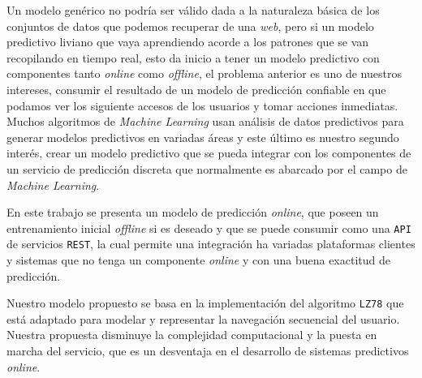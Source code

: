 Un modelo genérico no podría ser válido dada a la naturaleza básica de los conjuntos de datos que podemos recuperar de una \emph{web}, pero si un modelo predictivo liviano que vaya aprendiendo acorde a los patrones que se van recopilando en tiempo real, esto da inicio a tener un modelo predictivo con componentes tanto \emph{online} como \emph{offline}, el problema anterior es uno de nuestros intereses, consumir el resultado de un modelo de predicción confiable en que podamos ver los siguiente accesos de los usuarios y tomar acciones inmediatas. Muchos algoritmos de \emph{Machine Learning} usan análisis de datos predictivos para generar modelos predictivos en variadas áreas y este último es nuestro segundo interés, crear un modelo predictivo que se pueda integrar con los componentes de un servicio de predicción discreta que normalmente es abarcado por el campo de \emph{Machine Learning}.  

En este trabajo se presenta un modelo de predicción \emph{online}, que poseen un entrenamiento inicial \emph{offline} si es deseado y que se puede consumir como una \texttt{API} de servicios \texttt{REST}, la cual permite una integración ha variadas plataformas clientes y sistemas que no tenga un componente \emph{online} y con una buena exactitud de predicción. 

Nuestro modelo propuesto se basa en la implementación del algoritmo \texttt{LZ78} que está adaptado para modelar y representar la navegación secuencial del usuario. Nuestra propuesta disminuye la complejidad computacional  y la puesta en marcha del servicio, que es un desventaja en el desarrollo de sistemas predictivos \emph{online}.

